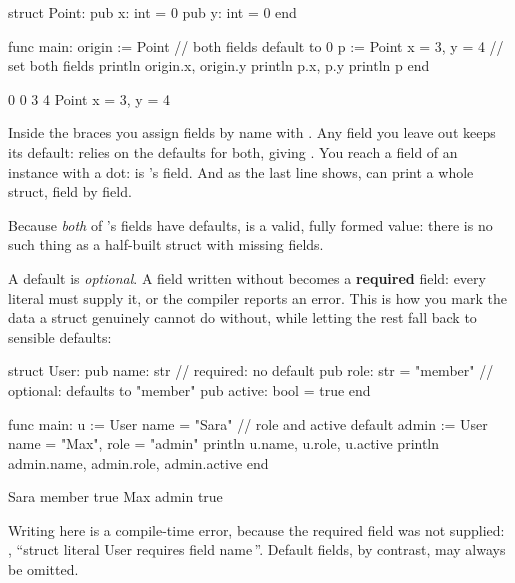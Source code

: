 \begin{salamen}
struct Point:
    pub x: int = 0
    pub y: int = 0
end

func main:
    origin := Point {}                 // both fields default to 0
    p := Point { x = 3, y = 4 }        // set both fields
    println origin.x, origin.y
    println p.x, p.y
    println p
end
\end{salamen}

\begin{progout}
0 0
3 4
Point {x = 3, y = 4}
\end{progout}

Inside the braces you assign fields by name with . Any field
you leave out keeps its default:  relies on the defaults for
both, giving . You reach a field of an instance with a dot:
 is 's  field. And as the last line shows,
 can print a whole struct, field by field.

\begin{note}
Because \emph{both} of 's fields have defaults,  is
a valid, fully formed value: there is no such thing as a half-built struct with
missing fields.
\end{note}

A default is \emph{optional}. A field written without  becomes a
\textbf{required} field: every literal must supply it, or the compiler reports an
error. This is how you mark the data a struct genuinely cannot do without, while
letting the rest fall back to sensible defaults:

\begin{salamen}
struct User:
    pub name: str                 // required: no default
    pub role: str = "member"      // optional: defaults to "member"
    pub active: bool = true
end

func main:
    u := User { name = "Sara" }              // role and active default
    admin := User { name = "Max", role = "admin" }
    println u.name, u.role, u.active
    println admin.name, admin.role, admin.active
end
\end{salamen}

\begin{progout}
Sara member true
Max admin true
\end{progout}

Writing  here is a compile-time error, because the required field
 was not supplied: , ``struct literal \textquotesingle{}User\textquotesingle{} requires field
\textquotesingle{}name\textquotesingle{}\,''. Default fields, by contrast, may always be omitted.

